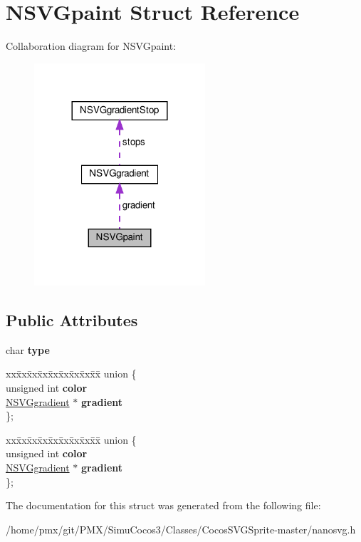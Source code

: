 \hypertarget{structNSVGpaint}{}\section{N\+S\+V\+Gpaint Struct Reference}
\label{structNSVGpaint}


Collaboration diagram for N\+S\+V\+Gpaint\+:
\nopagebreak
\begin{figure}[H]
\begin{center}
\leavevmode
\includegraphics[width=180pt]{structNSVGpaint__coll__graph}
\end{center}
\end{figure}
\subsection*{Public Attributes}
\begin{DoxyCompactItemize}
\item 
\mbox{\label{structNSVGpaint_a02ed7245e1a22db72952427801dbfa9f}} 
char {\bfseries type}
\item 
\mbox{\label{structNSVGpaint_ac70f524c16bdf75550f5feefeeec8bf4}} 
\begin{tabbing}
xx\=xx\=xx\=xx\=xx\=xx\=xx\=xx\=xx\=\kill
union \{\\
\>unsigned int {\bfseries color}\\
\>\hyperlink{structNSVGgradient}{NSVGgradient} $\ast$ {\bfseries gradient}\\
\}; \\

\end{tabbing}\item 
\mbox{\label{structNSVGpaint_a10f7e0216d8359e0bd1e6340e1504634}} 
\begin{tabbing}
xx\=xx\=xx\=xx\=xx\=xx\=xx\=xx\=xx\=\kill
union \{\\
\>unsigned int {\bfseries color}\\
\>\hyperlink{structNSVGgradient}{NSVGgradient} $\ast$ {\bfseries gradient}\\
\}; \\

\end{tabbing}\end{DoxyCompactItemize}


The documentation for this struct was generated from the following file\+:\begin{DoxyCompactItemize}
\item 
/home/pmx/git/\+P\+M\+X/\+Simu\+Cocos3/\+Classes/\+Cocos\+S\+V\+G\+Sprite-\/master/nanosvg.\+h\end{DoxyCompactItemize}
